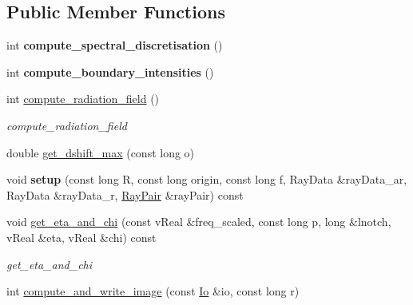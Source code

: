 \subsection*{Public Member Functions}
\begin{DoxyCompactItemize}
\item 
\mbox{\label{structSimulation_ae7e550fa89bc4439dc3c90123b068c93}} 
int {\bfseries compute\+\_\+spectral\+\_\+discretisation} ()
\item 
\mbox{\label{structSimulation_a0c63659d07e5bc9a8dcb8c675e8d1944}} 
int {\bfseries compute\+\_\+boundary\+\_\+intensities} ()
\item 
\mbox{\label{structSimulation_a36998d85e140ba7f7e7ceb0ea7f1ba80}} 
int \mbox{\hyperlink{structSimulation_a36998d85e140ba7f7e7ceb0ea7f1ba80}{compute\+\_\+radiation\+\_\+field}} ()
\begin{DoxyCompactList}\small\item\em compute\+\_\+radiation\+\_\+field \end{DoxyCompactList}\item 
double \mbox{\hyperlink{structSimulation_a37df96c36c99a3591bb0a7a6f74fa1a1}{get\+\_\+dshift\+\_\+max}} (const long o)
\item 
\mbox{\label{structSimulation_aa21d335fc6655ca2f4cc594193df51e0}} 
void {\bfseries setup} (const long R, const long origin, const long f, Ray\+Data \&ray\+Data\+\_\+ar, Ray\+Data \&ray\+Data\+\_\+r, \mbox{\hyperlink{structRayPair}{Ray\+Pair}} \&ray\+Pair) const
\item 
\mbox{\label{structSimulation_a0cc12a9513e60b8ebec5a01a44c59db3}} 
void \mbox{\hyperlink{structSimulation_a0cc12a9513e60b8ebec5a01a44c59db3}{get\+\_\+eta\+\_\+and\+\_\+chi}} (const v\+Real \&freq\+\_\+scaled, const long p, long \&lnotch, v\+Real \&eta, v\+Real \&chi) const
\begin{DoxyCompactList}\small\item\em get\+\_\+eta\+\_\+and\+\_\+chi \end{DoxyCompactList}\item 
int \mbox{\hyperlink{structSimulation_a50e59ee3542fc6226ad7dbec52dc8c72}{compute\+\_\+and\+\_\+write\+\_\+image}} (const \mbox{\hyperlink{structIo}{Io}} \&io, const long r)
\item 

\end{DoxyCompactItemize}
